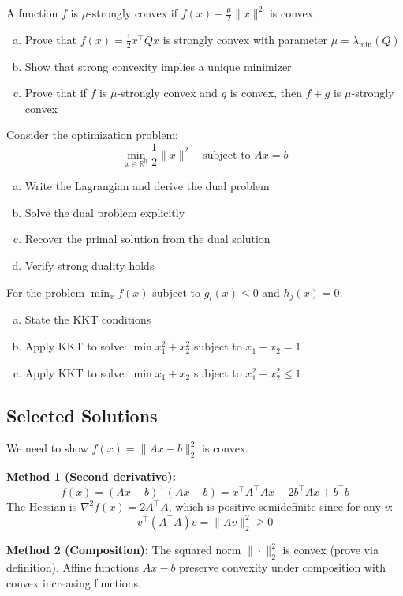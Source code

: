 \documentclass[../main.tex]{subfiles}
\begin{document}
\begin{simpleexercise}
A function $f$ is $\mu$-strongly convex if $f(x) - \frac{\mu}{2}\|x\|^2$ is convex.
\begin{enumerate}[(a)]
    \item Prove that $f(x) = \frac{1}{2}x^\top Q x$ is strongly convex with parameter $\mu = \lambda_{\min}(Q)$
    \item Show that strong convexity implies a unique minimizer
    \item Prove that if $f$ is $\mu$-strongly convex and $g$ is convex, then $f + g$ is $\mu$-strongly convex
\end{enumerate}
\end{simpleexercise}

\begin{simpleexercise}
Consider the optimization problem:
\[
\min_{x \in \mathbb{R}^n} \frac{1}{2}\|x\|^2 \quad \text{subject to } Ax = b
\]
\begin{enumerate}[(a)]
    \item Write the Lagrangian and derive the dual problem
    \item Solve the dual problem explicitly
    \item Recover the primal solution from the dual solution
    \item Verify strong duality holds
\end{enumerate}
\end{simpleexercise}

\begin{simpleexercise}
For the problem $\min_{x} f(x)$ subject to $g_i(x) \leq 0$ and $h_j(x) = 0$:
\begin{enumerate}[(a)]
    \item State the KKT conditions
    \item Apply KKT to solve: $\min x_1^2 + x_2^2$ subject to $x_1 + x_2 = 1$
    \item Apply KKT to solve: $\min x_1 + x_2$ subject to $x_1^2 + x_2^2 \leq 1$
\end{enumerate}
\end{simpleexercise}

\subsection{Selected Solutions}

\begin{solution}[Exercise 1.1(c)]
We need to show $f(x) = \|Ax - b\|_2^2$ is convex.

\textbf{Method 1 (Second derivative):}
\[
f(x) = (Ax - b)^\top(Ax - b) = x^\top A^\top A x - 2b^\top Ax + b^\top b
\]
The Hessian is $\nabla^2 f(x) = 2A^\top A$, which is positive semidefinite since for any $v$:
\[
v^\top (A^\top A) v = \|Av\|_2^2 \geq 0
\]

\textbf{Method 2 (Composition):}
The squared norm $\|\cdot\|_2^2$ is convex (prove via definition). Affine functions $Ax - b$ preserve convexity under composition with convex increasing functions.
\end{solution}
\end{document}
